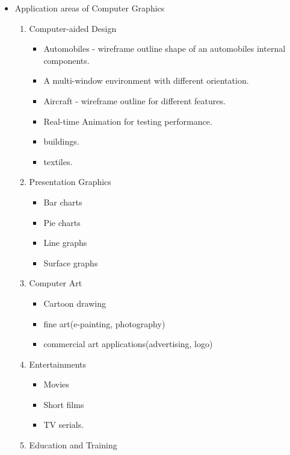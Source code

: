 \documentclass[UTF8]{ctexart}
\begin{document}
\begin{itemize}
\begin{enumerate}
    \end{enumerate}
    \item Application areas of Computer Graphics
        \begin{enumerate}
            \item Computer-aided Design
            \begin{itemize}
                \item Automobiles - wireframe outline shape of an automobiles internal components.
                \item A multi-window environment with different orientation.
                \item Aircraft - wireframe outline for different features.
                \item Real-time Animation for testing performance.
                \item buildings.
                \item textiles.
            \end{itemize}
            \item Presentation Graphics
            \begin{itemize}
                \item Bar charts
                \item Pie charts
                \item Line graphs
                \item Surface graphs
            \end{itemize}
            \item Computer Art
            \begin{itemize}
                \item Cartoon drawing
                \item fine art(e-painting, photography)
                \item commercial art applications(advertising, logo)
            \end{itemize}
            \item Entertainments
            \begin{itemize}
                \item Movies
                \item Short films
                \item TV serials.
            \end{itemize}
            \item Education and Training
            \begin{itemize}

\end{itemize}
\end{enumerate}
\end{itemize}
\end{document}
